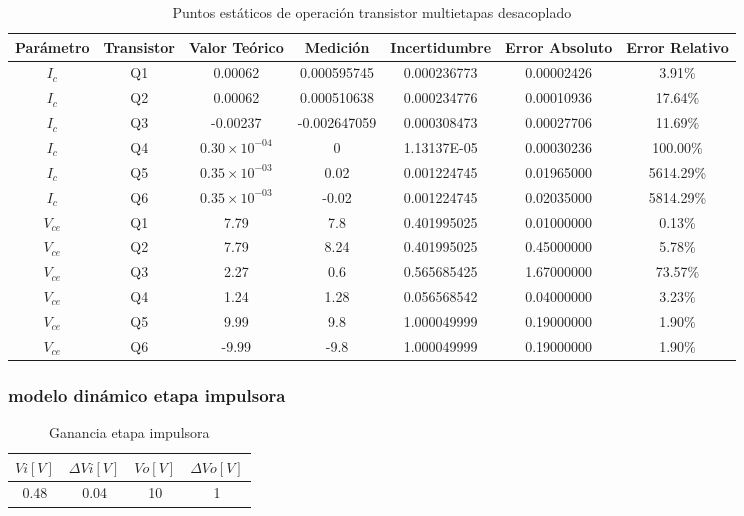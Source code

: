 \begin{table}[h!]
\centering
\begin{tabular}{|c|c|c|c|c|c|c|}
\hline
\textbf{Parámetro} & \textbf{Transistor} & \textbf{Valor Teórico} & \textbf{Medición} & \textbf{Incertidumbre} & \textbf{Error Absoluto} & \textbf{Error Relativo} \\ \hline
$I_{c}$ & Q1 & 0.00062 & 0.000595745 & 0.000236773 & 0.00002426 & 3.91\% \\ \hline
$I_{c}$ & Q2 & 0.00062 & 0.000510638 & 0.000234776 & 0.00010936 & 17.64\% \\ \hline
$I_{c}$ & Q3 & -0.00237 & -0.002647059 & 0.000308473 & 0.00027706 & 11.69\% \\ \hline
$I_{c}$ & Q4 & $0.30\times10^{-04}$ & 0 & 1.13137E-05 & 0.00030236 & 100.00\% \\ \hline
$I_{c}$ & Q5 & $0.35\times10^{-03}$ & 0.02 & 0.001224745 & 0.01965000 & 5614.29\% \\ \hline
$I_{c}$ & Q6 & $0.35\times10^{-03}$ & -0.02 & 0.001224745 & 0.02035000 & 5814.29\% \\ \hline
$V_{ce}$ & Q1 & 7.79 & 7.8 & 0.401995025 & 0.01000000 & 0.13\% \\ \hline
$V_{ce}$ & Q2 & 7.79 & 8.24 & 0.401995025 & 0.45000000 & 5.78\% \\ \hline
$V_{ce}$ & Q3 & 2.27 & 0.6 & 0.565685425 & 1.67000000 & 73.57\% \\ \hline
$V_{ce}$ & Q4 & 1.24 & 1.28 & 0.056568542 & 0.04000000 & 3.23\% \\ \hline
$V_{ce}$ & Q5 & 9.99 & 9.8 & 1.000049999 & 0.19000000 & 1.90\% \\ \hline
$V_{ce}$ & Q6 & -9.99 & -9.8 & 1.000049999 & 0.19000000 & 1.90\% \\ \hline
\end{tabular}
\caption{Puntos estáticos de operación transistor multietapas desacoplado}
\label{tab:med-puntos-estaticos-operacion-transistor-multietapas-desacoplado}
\end{table}

\FloatBarrier
\subsubsection{modelo dinámico etapa impulsora}

\begin{table}[h!]
\centering
\begin{tabular}{|c|c|c|c|}
\hline
\textbf{\(Vi[V]\)} & \textbf{\(\varDelta Vi[V]\)} & \textbf{\(Vo[V]\)} & \textbf{\(\varDelta Vo[V]\)} \\ \hline
0.48 & 0.04 & 10 & 1 \\ \hline
\end{tabular}
\caption{Ganancia etapa impulsora}
\label{tab:med-ganancia-etapa-impulsora}
\end{table}

